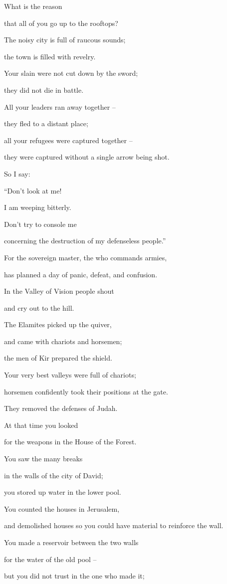 {\par }{\Q What
is the reason
\par }{\Q that
all
of you go up
to the rooftops?
\par }{\Q {}The noisy
city
is full
of raucous
sounds;
\par }{\Q the town
is filled with revelry.
\par }{\Q Your slain
were not
cut down by the sword;
\par }{\Q they did not
die
in battle.
\par }{\Q All
your leaders
ran away
together
–
\par }{\Q they fled
to a distant
place;
\par }{\Q all
your refugees were captured
together
–
\par }{\Q they were captured
without a single arrow being shot.
\par }{\Q {}So
I say:
\par }{\Q “Don’t look
at me!

\par }{\Q I am weeping
bitterly.
\par }{\Q Don’t
try
to console
me
\par }{\Q concerning
the destruction
of my defenseless
people.”
\par }{\Q {}For
the sovereign
master, the
{}
who commands armies,
\par }{\Q has planned a day
of panic,
defeat,
and confusion.
\par }{\Q In the Valley
of Vision
people shout

\par }{\Q and cry out
to
the hill.
\par }{\Q {}The Elamites
picked up
the quiver,
\par }{\Q and came with chariots
and horsemen;
\par }{\Q the men
of Kir
prepared
the shield.
\par }{\Q {}Your very best
valleys
were full
of chariots;
\par }{\Q horsemen
confidently
took their positions
at the gate.
\par }{\Q {}They removed
the
defenses
of Judah.
\par }{\Q At that time
you looked
\par }{\Q for the weapons
in the House
of the Forest.
\par }{\Q {}You saw
the many
breaks
\par }{\Q in the walls of the city
of David;
\par }{\Q you stored
up water
in the lower
pool.
\par }{\Q {}You counted
the houses
in Jerusalem,
\par }{\Q and demolished
houses
so you could have material to reinforce
the wall.
\par }{\Q {}You made a reservoir
between
the two walls
\par }{\Q for the water
of the old
pool
–
\par }{\Q but you did not
trust in the one who made
it;

}
